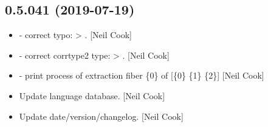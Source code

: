 \documentclass[a4paper,10pt,english]{report}
\begin{document}
\subsection{0.5.041 (2019-07-19)}
\label{\detokenize{misc/changelog:id101}}\begin{itemize}
\item {} 
 - correct typo:  \textendash{}\textgreater{} .
{[}Neil Cook{]}

\item {} 
 - correct corrtype2 type:
 \textendash{}\textgreater{} . {[}Neil Cook{]}

\item {} 
 - print process of extraction fiber \{0\} of {[}\{0\}
\{1\} \{2\}{]} {[}Neil Cook{]}

\item {} 
Update language database. {[}Neil Cook{]}

\item {} 
Update date/version/changelog. {[}Neil Cook{]}

\end{itemize}
\end{document}
